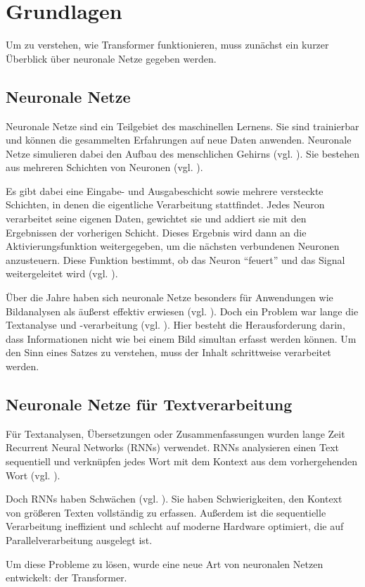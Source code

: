\chapter{Grundlagen}

Um zu verstehen, wie Transformer funktionieren, muss zunächst ein kurzer Überblick über neuronale Netze gegeben werden.  

\section{Neuronale Netze}

Neuronale Netze sind ein Teilgebiet des maschinellen Lernens.
Sie sind trainierbar und können die gesammelten Erfahrungen auf neue Daten anwenden.  
Neuronale Netze simulieren dabei den Aufbau des menschlichen Gehirns (vgl. \cite[S. 14]{Kinnebrock.2018}).  
Sie bestehen aus mehreren Schichten von Neuronen (vgl. \cite[S. 25]{Kinnebrock.2018}).  

Es gibt dabei eine Eingabe- und Ausgabeschicht sowie mehrere versteckte Schichten, in denen die eigentliche Verarbeitung stattfindet.  
Jedes Neuron verarbeitet seine eigenen Daten, gewichtet sie und addiert sie mit den Ergebnissen der vorherigen Schicht.  
Dieses Ergebnis wird dann an die Aktivierungsfunktion weitergegeben, um die nächsten verbundenen Neuronen anzusteuern.  
Diese Funktion bestimmt, ob das Neuron \enquote{feuert} und das Signal weitergeleitet wird (vgl. \cite[S. 14]{Kinnebrock.2018}).  

Über die Jahre haben sich neuronale Netze besonders für Anwendungen wie Bildanalysen als äußerst effektiv erwiesen (vgl. \cite[S. 16]{paass.2020}).  
Doch ein Problem war lange die Textanalyse und -verarbeitung (vgl. \cite[S. 22]{paass.2020}).
Hier besteht die Herausforderung darin, dass Informationen nicht wie bei einem Bild simultan erfasst werden können.  
Um den Sinn eines Satzes zu verstehen, muss der Inhalt schrittweise verarbeitet werden.  

\section{Neuronale Netze für Textverarbeitung}

Für Textanalysen, Übersetzungen oder Zusammenfassungen wurden lange Zeit Recurrent Neural Networks (RNNs) verwendet.  
RNNs analysieren einen Text sequentiell und verknüpfen jedes Wort mit dem Kontext aus dem vorhergehenden Wort (vgl. \cite[S. 2]{attention}).  

Doch RNNs haben Schwächen (vgl. \cite[S. 2]{attention}).
Sie haben Schwierigkeiten, den Kontext von größeren Texten vollständig zu erfassen.  
Außerdem ist die sequentielle Verarbeitung ineffizient und schlecht auf moderne Hardware optimiert, die auf Parallelverarbeitung ausgelegt ist.  

Um diese Probleme zu lösen, wurde eine neue Art von neuronalen Netzen entwickelt: der Transformer.  
